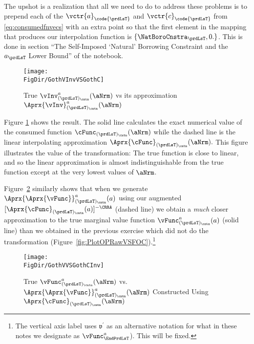 \documentclass[\econtexRoot/SolvingMicroDSOPs]{subfiles}
\begin{document}
The upshot is a realization that all we need to do to address these problems is to prepend each of the $\vctr{a}_{\code{\prdLsT}}$ and $\vctr{c}_{\code{\prdLsT}}$ from \eqref{eq:consumedfnvecs} with an extra point so that the first element in the mapping that produces our interpolation function is $\{\NatBoroCnstra_{\prdLsT},0.\}$. This is done in section ``The Self-Imposed `Natural' Borrowing Constraint and the $a_{\prdLsT}$ Lower Bound'' of the notebook.%


\hypertarget{GothVInvVSGothC}{}
\begin{figure}
  \centerline{\texttt{[image: \\FigDir/GothVInvVSGothC]}}
  \caption{True $\vInv^{a}_{(\prdLsT)_\cntn}(\aNrm)$ vs its approximation $\Aprx{\vInv}^{a}_{(\prdLsT)_\cntn}(\aNrm)$}
  \label{fig:GothVInvVSGothC}
\end{figure}

Figure \ref{fig:GothVInvVSGothC} shows the result. The solid line calculates the exact numerical value of the consumed function $\cFunc_{(\prdLsT)_\cntn}(\aNrm)$ while the dashed line is the linear interpolating approximation $\Aprx{\cFunc}_{(\prdLsT)_\cntn}(\aNrm).$ This figure illustrates the value of the transformation: The true function is close to linear, and so the linear approximation is almost indistinguishable from the true function except at the very lowest values of $\aNrm$.

Figure~\ref{fig:GothVVSGothCInv} similarly shows that when we generate $\Aprx{\Aprx{\vFunc}}_{(\prdLsT)_\cntn}^{a}(a)$ using our augmented $[\Aprx{\cFunc}_{(\prdLsT)_\cntn}(a)]^{-\CRRA}$ (dashed line) we obtain a \textit{much} closer approximation to the true marginal value function $\vFunc^{a}_{(\prdLsT)_\cntn}(a)$ (solid line) than we obtained in the previous exercise which did not do the transformation (Figure~\ref{fig:PlotOPRawVSFOC}).\footnote{The vertical axis label uses $\mathfrak{v}^{\prime}$ as an alternative notation for what in these notes we designate as $\vFunc^{a}_{\EndPrdLsT}$).  This will be fixed.}

\hypertarget{GothVVSGothCInv}{}
\begin{figure}
  \centerline{\texttt{[image: \\FigDir/GothVVSGothCInv]}}
  \caption{True $\vFunc^{a}_{(\prdLsT)_\cntn}(\aNrm)$ vs. $\Aprx{\Aprx{\vFunc}}_{(\prdLsT)_\cntn}^{a}(\aNrm)$ Constructed Using $\Aprx{\cFunc}_{(\prdLsT)_\cntn}(\aNrm)$}
  \label{fig:GothVVSGothCInv}
\end{figure}
\end{document}
